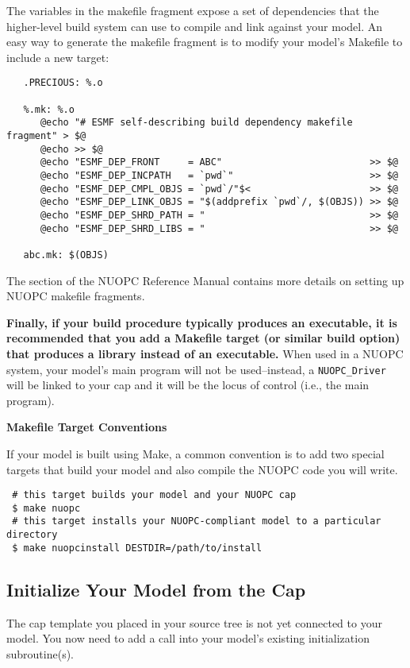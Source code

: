 The variables in the makefile fragment expose a set of dependencies that the
higher-level build system can use to compile and link against your model.
An easy way to generate the makefile fragment is to modify your model's
Makefile to include a new target:

\begin{verbatim}
   .PRECIOUS: %.o

   %.mk: %.o
      @echo "# ESMF self-describing build dependency makefile fragment" > $@
      @echo >> $@
      @echo "ESMF_DEP_FRONT     = ABC"                          >> $@
      @echo "ESMF_DEP_INCPATH   = `pwd`"                        >> $@
      @echo "ESMF_DEP_CMPL_OBJS = `pwd`/"$<                     >> $@
      @echo "ESMF_DEP_LINK_OBJS = "$(addprefix `pwd`/, $(OBJS)) >> $@
      @echo "ESMF_DEP_SHRD_PATH = "                             >> $@
      @echo "ESMF_DEP_SHRD_LIBS = "                             >> $@

   abc.mk: $(OBJS)
\end{verbatim}

The 
section of the NUOPC Reference Manual contains more details on setting up NUOPC makefile fragments.

\textbf{Finally, if your build procedure typically produces an executable, it is
recommended that you add a Makefile target (or similar build option)
that produces a library instead of an executable.}  When used in a NUOPC
system, your model's main program will not be used--instead, a {\tt NUOPC\_Driver}
will be linked to your cap and it will be the locus of control
(i.e., the main program).

\textbf{Makefile Target Conventions}

If your model is built using Make, a common convention is to add
two special targets that build your model and also compile the NUOPC
code you will write.

\begin{verbatim} 
 # this target builds your model and your NUOPC cap 
 $ make nuopc
 # this target installs your NUOPC-compliant model to a particular directory
 $ make nuopcinstall DESTDIR=/path/to/install
\end{verbatim}


\subsection{Initialize Your Model from the Cap}
\label{sec:initmodelfromcap}
The cap template you placed in your source tree is not yet connected
to your model.  You now need to add a call into your model's existing
initialization subroutine(s).

